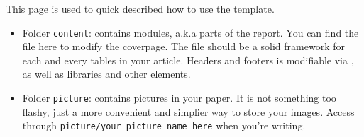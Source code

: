This page is used to quick described how to use the template.
\begin{itemize}
    \item Folder \texttt{content}: contains modules, a.k.a parts of the report. 
        You can find the  file here to modify the coverpage. The  file
        should be a solid framework for each and every tables in your article. Headers and footers is modifiable via 
        , as well as libraries and other elements.
    \item Folder \texttt{picture}: contains pictures in your paper. It is not something too flashy, just a 
    more convenient and simplier way to store your images. Access through \texttt{picture/your\_picture\_name\_here} when you're
    writing.
\end{itemize}
